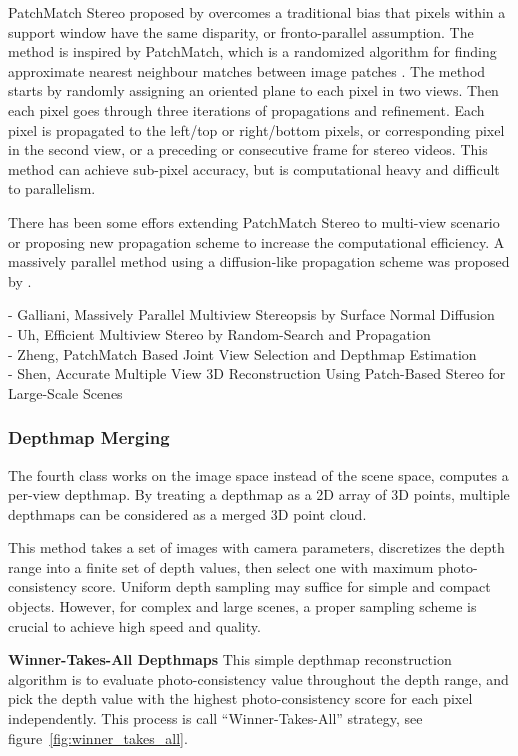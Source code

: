 PatchMatch Stereo proposed by \citeauthor{bleyer2011patchmatch} overcomes a traditional bias that pixels within a support window have the same disparity, or fronto-parallel assumption. The method is inspired by PatchMatch, which is a randomized algorithm for finding approximate nearest neighbour matches between image patches \cite{Barnes:2009:PAR}. The method starts by randomly assigning an oriented plane to each pixel in two views. Then each pixel goes through three iterations of propagations and refinement. Each pixel is propagated to the left/top or right/bottom pixels, or corresponding pixel in the second view, or a preceding or consecutive frame for stereo videos. This method can achieve sub-pixel accuracy, but is computational heavy and difficult to parallelism.

There has been some effors extending PatchMatch Stereo to multi-view scenario or proposing new propagation scheme to increase the computational efficiency. A massively parallel method using a diffusion-like propagation scheme was proposed by \citeauthor{galliani2015massively}.

- Galliani, Massively Parallel Multiview Stereopsis by Surface Normal Diffusion\\
- Uh, Efficient Multiview Stereo by Random-Search and Propagation\\
- Zheng, PatchMatch Based Joint View Selection and Depthmap Estimation\\
- Shen, Accurate Multiple View 3D Reconstruction Using Patch-Based Stereo for Large-Scale Scenes\\

\subsubsection{Depthmap Merging}

The fourth class works on the image space instead of the scene space, computes a per-view depthmap. By treating a depthmap as a 2D array of 3D points, multiple depthmaps can be considered as a merged 3D point cloud.

This method takes a set of images with camera parameters, discretizes the depth range into a finite set of depth values, then select one with maximum photo-consistency score. Uniform depth sampling may suffice for simple and compact objects. However, for complex and large scenes, a proper sampling scheme is crucial to achieve high speed and quality.

\textbf{Winner-Takes-All Depthmaps} This simple depthmap reconstruction algorithm is to evaluate photo-consistency value throughout the depth range, and pick the depth value with the highest photo-consistency score for each pixel independently. This process is call ``Winner-Takes-All'' strategy, see figure~\ref{fig:winner_takes_all}.

